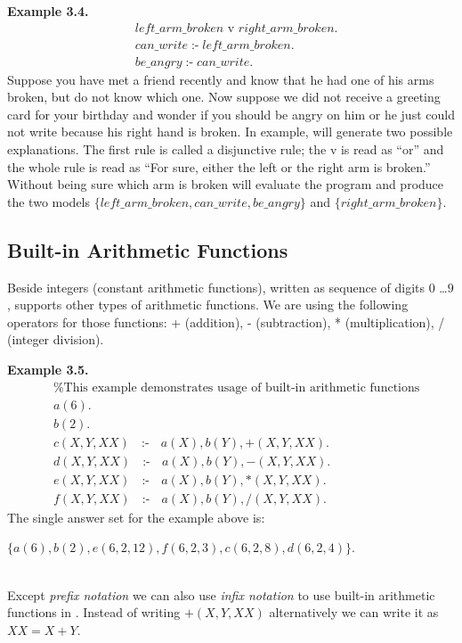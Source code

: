 \documentclass[14pt,a4paper, titlepage]{article}
\DeclareMathOperator{\leftimpl}{:-}
\begin{document}
\textbf{Example 3.4.}
\begin{align*}
& \mathit{left\_arm\_broken} \text{ v } \mathit{right\_arm\_broken}.\\
& \mathit{can\_write} \leftimpl \mathit{left\_arm\_broken}.\\
& \mathit{be\_angry} \leftimpl \mathit{can\_write}.
\end{align*}
Suppose you have met a friend recently and know that he had one of his arms broken, but do not know which one. Now suppose we did not receive a greeting card for your birthday and wonder if you should be angry on him or he just could not write because his right hand is broken. In example, \dlvhex{} will generate two possible explanations. The first rule is called a disjunctive rule; the v is read as \enquote{or} and the whole rule is read as \enquote{For sure, either the left or the right arm is broken.} Without being sure which arm is broken \dlvhex{} will evaluate the program and produce the two models $\mathit{\{left\_arm\_broken, can\_write, be\_angry\}}$ and $\mathit{\{right\_arm\_broken\}}$.  

\subsection{Built-in Arithmetic Functions}
Beside integers (constant arithmetic functions), written as sequence of digits $0$ \dots $9$, \dlvhex{} supports other types of arithmetic functions. We are using the following operators for those functions: + (addition), - (subtraction), * (multiplication), / (integer division). 

\textbf{Example 3.5.}
\begin{align*}
& \text{\% This example demonstrates usage of built-in arithmetic functions} \\
& \mathit{a}(6). \\
& \mathit{b}(2). \\
& c(X,Y,XX) \text{ } \leftimpl \text{ } a(X), b(Y),+(X, Y, XX). \\
& d(X,Y,XX) \text{ } \leftimpl \text{ } a(X), b(Y),-(X, Y, XX). \\
& e(X,Y,XX) \text{ } \leftimpl \text{ } a(X), b(Y),*(X, Y, XX). \\
& f(X,Y,XX) \text{ } \leftimpl \text{ } a(X), b(Y),/(X, Y, XX).
\end{align*}
The single answer set for the example above is:\\ \centerline{$\mathit{\{a(6),b(2),e(6,2,12),f(6,2,3),c(6,2,8),d(6,2,4)\}}$.}
\\Except \emph{prefix notation} we can also use \emph{infix notation} to use built-in arithmetic functions in \dlvhex{}. Instead of writing $\mathit{+(X, Y, XX)}$ alternatively we can write it as $\mathit{XX=X+Y}$. 
\end{document}
